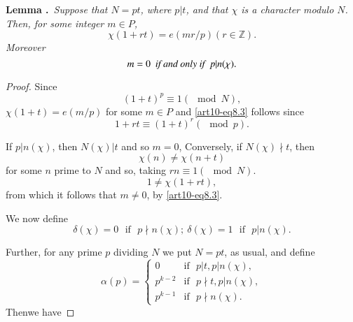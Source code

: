 \medskip
\noindent
{\bf Lemma .\label{art10-lem8.3}}~{\em Suppose that $N=pt$, where $p|t$, and that $\chi$ is a character modulo $N$. Then, for some integer $m\in P$,}
\begin{equation}
\chi(1+rt)=e(mr/p)(r\in \mathbb{Z}).\label{art10-eq8.3}
\end{equation}
{\em Moreover}
\begin{equation}
m=0\text{\em~ if and only if~ } p|n(\chi).\label{art10-eq8.4}
\end{equation}

\begin{proof}
Since
$$
(1+t)^{p}\equiv 1(\mod N),
$$
$\chi(1+t)=e(m/p)$ for some $m\in P$ and \eqref{art10-eq8.3} follows since
$$
1+rt\equiv (1+t)^{r}(\mod p).
$$

If $p|n(\chi)$, then $N(\chi)|t$ and so $m=0$, Conversely, if $N(\chi)\nmid t$, then
$$
\chi(n)\neq \chi(n+t)
$$
for some $n$ prime to $N$ and so, taking $rn\equiv 1(\mod N)$.
$$
1\neq \chi(1+rt),
$$
from which it follows that $m\neq 0$, by \eqref{art10-eq8.3}.

We now define
\begin{equation}
\delta(\chi)=0\text{~ if~ } p\nmid n(\chi); \ \delta(\chi)=1\text{~ if~ } p|n(\chi).\label{art10-eq8.5}
\end{equation}

Further, for any prime $p$ dividing $N$ we put $N=pt$, as usual, and define
\begin{equation}
\alpha(p)=
\begin{cases}
0 & \text{if~ } p|t, p|n(\chi),\\
p^{k-2} & \text{if~ } p\nmid t, p|n(\chi),\\
p^{k-1} & \text{if~ } p\nmid n(\chi).
\end{cases}\label{art10-eq8.6}
\end{equation}
Then\pageoriginale we have 
\end{proof}
